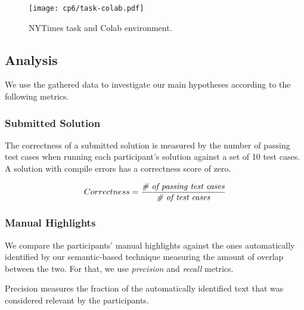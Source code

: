 {\clearpage

\begin{landscape}
\begin{figure}
    \centering
    \texttt{[image: cp6/task-colab.pdf]}
    \caption{NYTimes task and Colab environment.}
    \label{fig:nytimes-task-colab}
\end{figure}
\end{landscape}

\clearpage


\subsection{Analysis}




We use the gathered data to investigate our main hypotheses according to the following metrics.



\subsubsection{Submitted Solution}

 
The correctness of a submitted solution is measured by the number of passing test cases
when running each participant's solution against a set of 10 test cases. 
A solution with compile errors has a correctness score of zero.


\smallskip
\begin{small}


\begin{equation}
    Correctness = \frac{ \text{\textit{\# of passing test cases}}}{\text{\textit{\#  of test cases}}}
\end{equation}
\end{small}



\subsubsection{Manual Highlights}


We compare the participants' manual highlights  against the ones automatically identified by our semantic-based technique measuring the amount of overlap between the two. 
For that, we use \textit{precision} and \textit{recall} metrics. 




Precision measures the fraction of the automatically identified text that was  considered relevant
by the participants.

}
